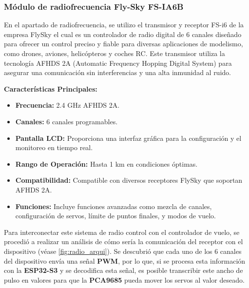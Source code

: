         \subsubsection{Módulo de radiofrecuencia Fly-Sky FS-IA6B}\vspace{5px}

            En el apartado de radiofrecuencia, se utilizo el transmisor y receptor FS-i6 de la empresa FlySky el cual es un controlador de radio digital de 6 canales diseñado para ofrecer un control preciso y fiable para diversas aplicaciones de modelismo, como drones, aviones, helicópteros y coches RC. Este transmisor utiliza la tecnología AFHDS 2A (Automatic Frequency Hopping Digital System) para asegurar una comunicación sin interferencias y una alta inmunidad al ruido. \cite{flysky}\vspace{5px}

            \textbf{Características Principales:}\vspace{5px}

            \begin{itemize}
                \item \textbf{Frecuencia:} 2.4 GHz AFHDS 2A.
                \item \textbf{Canales:} 6 canales programables.
                \item \textbf{Pantalla LCD:} Proporciona una interfaz gráfica para la configuración y el monitoreo en tiempo real.\cite{19}
                \item \textbf{Rango de Operación:} Hasta 1 km en condiciones óptimas.\cite{19}
                \item \textbf{Compatibilidad:} Compatible con diversos receptores FlySky que soportan AFHDS 2A.\cite{flysky}
                \item \textbf{Funciones:} Incluye funciones avanzadas como mezcla de canales, configuración de servos, límite de puntos finales, y modos de vuelo.   \cite{flysky}
            \end{itemize}\vspace{5px}

            Para interconectar este sistema de radio control con el controlador de vuelo, se procedió a realizar un análisis de cómo sería la comunicación del receptor con el dispositivo (véase \ref{fig:radio_arqui}). Se descubrió que cada uno de los 6 canales del dispositivo envía una señal \textbf{PWM}, por lo que, si se procesa esta información con la \textbf{ESP32-S3} y se decodifica esta señal, es posible transcribir este ancho de pulso en valores para que la \textbf{PCA9685} pueda mover los servos al valor deseado.\vspace{5px}


